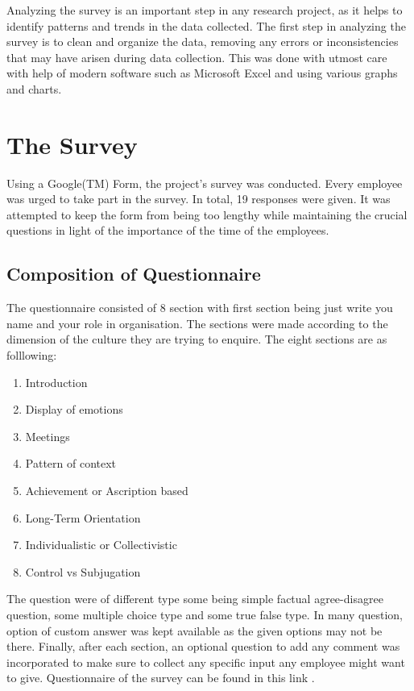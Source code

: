 \documentclass{article}
\begin{document}
Analyzing the survey is an important step in any research project, as it helps to identify patterns and trends in the data collected. The first step in analyzing the survey is to clean and organize the data, removing any errors or inconsistencies that may have arisen during data collection. This was done with utmost care with help of modern software such as Microsoft Excel and using various graphs and charts.

\section{The Survey}

Using a Google(TM) Form, the project's survey was conducted. Every employee was urged to take part in the survey. In total, 19 responses were given. It was attempted to keep the form from being too lengthy while maintaining the crucial questions in light of the importance of the time of the employees.

\subsection*{Composition of Questionnaire}

The questionnaire consisted of 8 section with first section being just write you name and your role in organisation. The sections were made according to the dimension of the culture they are trying to enquire. The eight sections are as folllowing:

\begin{enumerate}
    \item Introduction
    \item Display of emotions
    \item Meetings
    \item Pattern of context
    \item Achievement or Ascription based
    \item Long-Term Orientation
    \item Individualistic or Collectivistic
    \item Control vs Subjugation
\end{enumerate}

The question were of different type some being simple factual agree-disagree question, some multiple choice type and some true false type. In many question, option of custom answer was kept available as the given options may not be there. Finally, after each section, an optional question to add any comment was incorporated to make sure to collect any specific input any employee might want to give. Questionnaire of the survey can be found in this link \cite{ref: Survey Form}.
\end{document}
